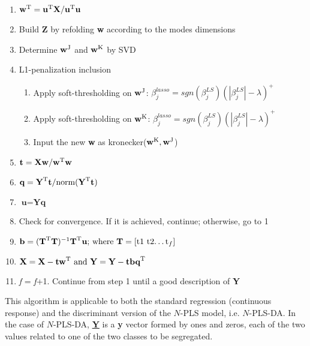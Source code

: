 \begin{enumerate}
    \item $\textbf{\text{w}}^\text{T}=\textbf{\text{u}}^\text{T}\textbf{\text{X}}/\textbf{\text{u}}^\text{T}\textbf{\text{u}}$
    \item Build \textbf{Z} by refolding \textbf{w} according to the modes dimensions
    \item Determine $\textbf{\text{w}}^\text{J}$ and $\textbf{\text{w}}^\text{K}$ by SVD
    \item L1-penalization inclusion
    \begin{enumerate}
        \item Apply soft-thresholding on $\textbf{\text{w}}^\text{J}$: $\beta_j^{lasso}=sgn(\beta_j^{LS})(|\beta_j^{LS}|-\lambda)^+$ 
        \item Apply soft-thresholding on $\textbf{\text{w}}^\text{K}$: $\beta_j^{lasso}=sgn(\beta_j^{LS})(|\beta_j^{LS}|-\lambda)^+$ 
        \item Input the new \textbf{w} as kronecker($\textbf{\text{w}}^\text{K}, \textbf{\text{w}}^\text{J}$)
    \end{enumerate}
    \item $\textbf{\text{t}}=\textbf{\text{Xw}}/\textbf{\text{w}}^\text{T}\textbf{\text{w}}$
    \item $\textbf{\text{q}}=\textbf{\text{Y}}^\text{T}\textbf{\text{t}}/\text{norm}(\textbf{\text{Y}}^\text{T}\textbf{\text{t}})$
    \item $\textbf{u}=\textbf{Yq}$
    \item Check for convergence. If it is achieved, continue; otherwise, go to 1
    \item $\textbf{\text{b}} = (\textbf{\text{T}}^\text{T}\textbf{\text{T}})^{-1}\textbf{\text{T}}^\text{T}\textbf{\text{u}} \text{; where} \ \textbf{\text{T}}=[\text{t1}\ \text{t2} \text{…} \text{t}_f]$
    \item $\textbf{\text{X}} = \textbf{\text{X}}-\textbf{\text{tw}}^\text{T} \ \text{and} \ \textbf{\text{Y}} = \textbf{\text{Y}}-\textbf{\text{tbq}}^\text{T}$
    \item \textit{f} = \textit{f}+1. Continue from step 1 until a good description of \textbf{Y}
\end{enumerate}
\vspace{20pt}

This algorithm is applicable to both the standard regression (continuous response) and the discriminant version of the $N$-PLS model, i.e. $N$-PLS-DA. In the case of $N$-PLS-DA, \textbf{\underline{Y}} is a \textbf{y} vector formed by ones and zeros, each of the two values related to one of the two classes to be segregated. 

